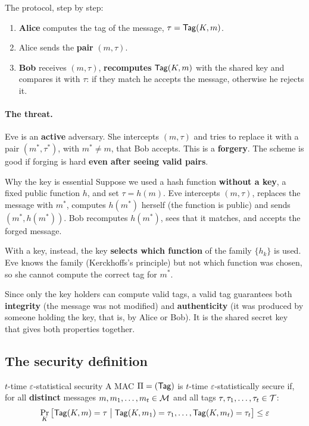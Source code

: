 The protocol, step by step:
\begin{enumerate}
  \item \textbf{Alice} computes the tag of the message, $\tau = \mathsf{Tag}(K, m)$.
  \item Alice sends the \textbf{pair} $(m, \tau)$.
  \item \textbf{Bob} receives $(m, \tau)$, \textbf{recomputes} $\mathsf{Tag}(K, m)$ with the shared key and compares it with $\tau$: if they match he accepts the message, otherwise he rejects it.
\end{enumerate}

\paragraph{The threat.} Eve is an \textbf{active} adversary. She intercepts $(m, \tau)$ and tries to replace it with a pair $(m^*, \tau^*)$, with $m^* \neq m$, that Bob accepts. This is a \textbf{forgery}. The scheme is good if forging is hard \textbf{even after seeing valid pairs}.

\begin{framedobs}{Why the key is essential}
  Suppose we used a hash function \textbf{without a key}, a fixed public function $h$, and set $\tau = h(m)$. Eve intercepts $(m, \tau)$, replaces the message with $m^*$, computes $h(m^*)$ herself (the function is public) and sends $(m^*, h(m^*))$. Bob recomputes $h(m^*)$, sees that it matches, and accepts the forged message.

  With a key, instead, the key \textbf{selects which function} of the family $\{h_k\}$ is used. Eve knows the family (Kerckhoffs's principle) but not which function was chosen, so she cannot compute the correct tag for $m^*$.
\end{framedobs}

Since only the key holders can compute valid tags, a valid tag guarantees both \textbf{integrity} (the message was not modified) and \textbf{authenticity} (it was produced by someone holding the key, that is, by Alice or Bob). It is the shared secret key that gives both properties together.

\subsection{The security definition}

\begin{frameddefn}[label={def:mac-security}]{$t$-time $\varepsilon$-statistical security}
  A MAC $\Pi = (\mathsf{Tag})$ is $t$-time $\varepsilon$-statistically secure if, for all \textbf{distinct} messages $m, m_1, \ldots, m_t \in \mathcal{M}$ and all tags $\tau, \tau_1, \ldots, \tau_t \in \mathcal{T}$:
  \[
    \Pr_K\big[\mathsf{Tag}(K, m) = \tau \;\big|\; \mathsf{Tag}(K, m_1) = \tau_1, \ldots, \mathsf{Tag}(K, m_t) = \tau_t\big] \leq \varepsilon
  \]
\end{frameddefn}


